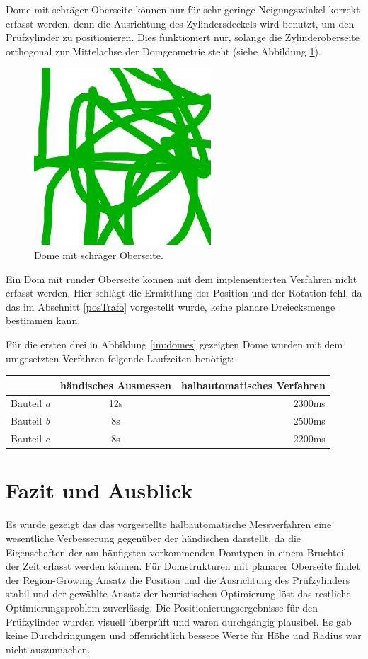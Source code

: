 Dome mit schr\"ager Oberseite k\"onnen nur f\"ur sehr geringe Neigungswinkel korrekt erfasst werden, denn die Ausrichtung des Zylindersdeckels wird benutzt, um den Pr\"ufzylinder zu positionieren. Dies funktioniert nur, solange die Zylinderoberseite orthogonal zur Mittelachse der Domgeometrie steht (siehe Abbildung \ref{im:schraegDom}).

\begin{figure}[ht]
\centerline{
	\includegraphics[width=0.19\columnwidth]{graphics/dummy.jpg}
}
\caption{Dome mit schr\"ager Oberseite.}
\label{im:schraegDom}
\end{figure}

Ein Dom mit runder Oberseite k\"onnen mit dem implementierten Verfahren nicht erfasst werden. Hier schl\"agt die Ermittlung der Position und der Rotation fehl, da das im Abschnitt \ref{posTrafo} vorgestellt wurde, keine planare Dreiecksmenge bestimmen kann. 

F\"ur die ersten drei in Abbildung \ref{im:domes} gezeigten Dome wurden mit dem umgesetzten Verfahren folgende Laufzeiten ben\"otigt:

\begin{center}
  \begin{tabular}{| l | c || r |}
    \hline
      & h\"andisches Ausmessen & halbautomatisches Verfahren \\ \hline
    Bauteil \textit{a} & 12s & 2300ms \\ \hline
    Bauteil \textit{b} & 8s  & 2500ms \\ \hline
    Bauteil \textit{c} & 8s & 2200ms \\
    \hline
  \end{tabular}
\end{center}

\section{Fazit und Ausblick}

Es wurde gezeigt das das vorgestellte halbautomatische Messverfahren eine wesentliche Verbesserung gegen\"uber der h\"andischen darstellt, da die Eigenschaften der am h\"aufigsten vorkommenden Domtypen in einem Bruchteil der Zeit erfasst werden k\"onnen. 
F\"ur Domstrukturen mit planarer Oberseite findet der Region-Growing Ansatz die Position und die Ausrichtung des Pr\"ufzylinders stabil und der gew\"ahlte Ansatz der heuristischen Optimierung l\"ost das restliche Optimierungsproblem zuverl\"assig. Die
Positionierungsergebnisse für den Pr\"ufzylinder wurden visuell überprüft und waren durchg\"angig plausibel. 
Es gab keine Durchdringungen und offensichtlich bessere Werte f\"ur H\"ohe und Radius war nicht auszumachen.

